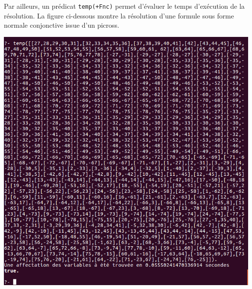 \documentclass[12pt,a4paper]{article}
\begin{document}
Par ailleurs, un prédicat \texttt{temp(+Fnc)} permet d'évaluer le temps d'exécution de la résolution. La figure ci-dessous montre la résolution d'une formule sous forme normale conjonctive issue d'un picross.

\begin{center}
\includegraphics[width = 400pt]{TempDpll.png}
\end{center}
\end{document}
